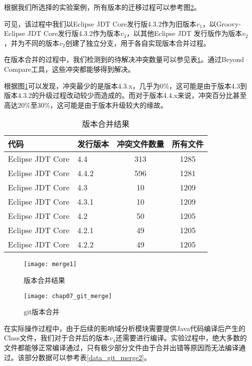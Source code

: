 根据我们所选择的实验案例，所有版本的迁移过程可以参考图\ref {exp_git_merge}。

可见，该过程中我们以Eclipse JDT Core发行版4.3.2作为旧版本$v_1$，以Groovy-Eclipse JDT Core发行版4.3.2作为版本$v_3$，以其他Eclipse JDT 发行版作为版本$v_2$，并为不同的版本$v_2$创建了独立分支，用于各自实现版本合并过程。

在版本合并的过程中，我们检测到的待解决冲突数量可以参见表\ref {data_git_merge}。通过Beyond Compare工具，这些冲突都能够得到解决。

根据图\ref {data_merge}可以发现，冲突最少的是版本4.3.x，几乎为0\%，这可能是由于版本4.3到版本4.3.2的升级过程改动较少而造成的。而对于版本4.4.x来说，冲突百分比甚至高达20\%至30\%，这可能是由于版本升级较大的缘故。

\begin{table}
	\caption{版本合并结果}
	\label{data_git_merge}
	\centering
	\begin{tabular}{llcc}
		\toprule[1.5pt]
		{\heiti 代码} & {\heiti 发行版本} & {\heiti 冲突文件数量} & {\heiti 所有文件}\\\midrule[1pt]
		Eclipse JDT Core & 4.4 & 313 & 1285\\
		Eclipse JDT Core & 4.4.2 & 596 & 1281\\
		Eclipse JDT Core & 4.3 & 10 & 1209\\
		Eclipse JDT Core & 4.3.1 & 10 & 1209\\
		Eclipse JDT Core & 4.2 & 50 & 1205\\
		Eclipse JDT Core & 4.2.1 & 49 & 1205\\
		Eclipse JDT Core & 4.2.2 & 49 & 1205\\
		\bottomrule[1.5pt]
	\end{tabular}
\end{table}

\begin{figure}[H]
	\centering
	\texttt{[image: merge1]}
	\caption {版本合并结果}
	\label {data_merge}	
\end{figure}


\begin{figure}[H]
	\centering
	\texttt{[image: chap07\_git\_merge]}
	\caption {git版本合并}
	\label {exp_git_merge}	
\end{figure}

在实际操作过程中，由于后续的影响域分析模块需要提供Java代码编译后产生的Class文件，我们对于合并后的版本$v_4$还需要进行编译。实验过程中，绝大多数的文件都能够正常编译通过，只有极少部分文件由于合并出错等原因而无法编译通过。该部分数据可以参考表\ref {data_git_merge2}。

